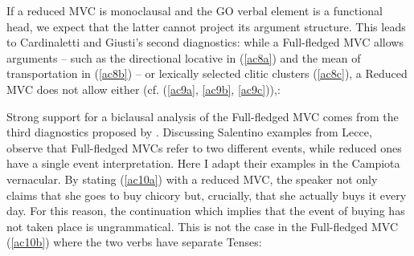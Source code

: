 \documentclass[output=paper]{langscibook}
\begin{document}
If a reduced MVC is monoclausal and the GO verbal element is a functional head, we expect that the latter cannot project its argument structure. This leads to Cardinaletti and Giusti’s second diagnostics: while a Full-fledged MVC allows arguments -- such as the directional  locative in (\ref{ac8a}) and the mean of transportation in (\ref{ac8b}) -- or lexically selected clitic clusters (\ref{ac8c}), a Reduced MVC does not allow either (cf. (\ref{ac9a}, \ref{ac9b}, \ref{ac9c})),:

\ea \label{ac8}
    \z
\ex \label{ac9}
    \z
\z

Strong support for a biclausal analysis of the Full-fledged MVC comes from the third diagnostics proposed by \citet{cardinaletti2001a, cardinaletti2019a}. Discussing Salentino examples from Lecce, \citet{cardinaletti2019a} observe that Full-fledged MVCs refer to two different events, while reduced ones have a single event interpretation. Here I adapt their examples in the Campiota vernacular.  By stating (\ref{ac10a}) with a reduced MVC, the speaker not only claims that she goes to buy chicory but, crucially, that she actually buys it every day. For this reason, the continuation which implies that the event of buying has not taken place is ungrammatical. This is not the case in the Full-fledged MVC (\ref{ac10b}) where the two verbs have separate Tenses:
\end{document}
